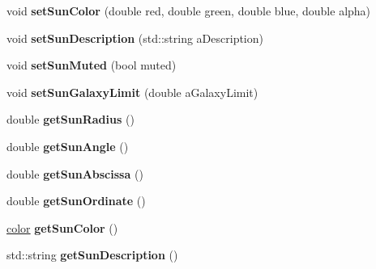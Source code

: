 \begin{DoxyCompactItemize}
\item 
\hypertarget{class_planetary_system_ad8147dc617112ffda00586dacfbb5906}{void {\bfseries set\-Sun\-Color} (double red, double green, double blue, double alpha)}\label{class_planetary_system_ad8147dc617112ffda00586dacfbb5906}

\item 
\hypertarget{class_planetary_system_a37a235bd398ad9bb04bf1fe9221984d9}{void {\bfseries set\-Sun\-Description} (std\-::string a\-Description)}\label{class_planetary_system_a37a235bd398ad9bb04bf1fe9221984d9}

\item 
\hypertarget{class_planetary_system_ad9ec9c897c36516f799c6b82da1711dd}{void {\bfseries set\-Sun\-Muted} (bool muted)}\label{class_planetary_system_ad9ec9c897c36516f799c6b82da1711dd}

\item 
\hypertarget{class_planetary_system_a25370ce39d5af0643bf8850ff937147d}{void {\bfseries set\-Sun\-Galaxy\-Limit} (double a\-Galaxy\-Limit)}\label{class_planetary_system_a25370ce39d5af0643bf8850ff937147d}

\item 
\hypertarget{class_planetary_system_a872610d54f65274b328bacbf26affd0f}{double {\bfseries get\-Sun\-Radius} ()}\label{class_planetary_system_a872610d54f65274b328bacbf26affd0f}

\item 
\hypertarget{class_planetary_system_acffbba4114efafe8a3f75034a87690bc}{double {\bfseries get\-Sun\-Angle} ()}\label{class_planetary_system_acffbba4114efafe8a3f75034a87690bc}

\item 
\hypertarget{class_planetary_system_aa9f3a4b0b1dc2766fd2d28520760a5a0}{double {\bfseries get\-Sun\-Abscissa} ()}\label{class_planetary_system_aa9f3a4b0b1dc2766fd2d28520760a5a0}

\item 
\hypertarget{class_planetary_system_ae26b7ccce77049eca7d5215862bdf5f8}{double {\bfseries get\-Sun\-Ordinate} ()}\label{class_planetary_system_ae26b7ccce77049eca7d5215862bdf5f8}

\item 
\hypertarget{class_planetary_system_aaf5cf21feb4b212222263187d1113e9d}{\hyperlink{structcolor}{color} {\bfseries get\-Sun\-Color} ()}\label{class_planetary_system_aaf5cf21feb4b212222263187d1113e9d}

\item 
\hypertarget{class_planetary_system_abff20785f1f706ba6e47581a2d6a299e}{std\-::string {\bfseries get\-Sun\-Description} ()}\label{class_planetary_system_abff20785f1f706ba6e47581a2d6a299e}


\end{DoxyCompactItemize}
